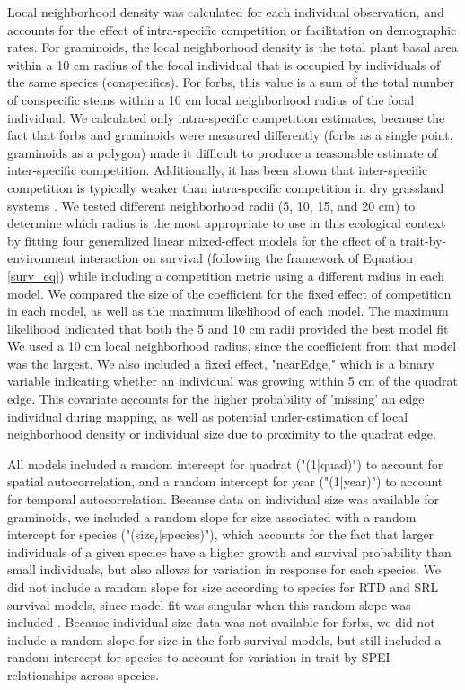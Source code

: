 \documentclass[12pt, letterpaper]{article}
\begin{document}
Local neighborhood density was calculated for each individual observation, and accounts for the effect of intra-specific competition or facilitation on demographic rates. For graminoids, the local neighborhood density is the total plant basal area within a 10 cm radius of the focal individual that is occupied by individuals of the same species (conspecifics). For forbs, this value is a sum of the total number of conspecific stems within a 10 cm local neighborhood radius of the focal individual. We calculated only intra-specific competition estimates, because the fact that forbs and graminoids were measured differently (forbs as a single point, graminoids as a polygon) made it difficult to produce a reasonable estimate of inter-specific competition. Additionally, it has been shown that inter-specific competition is typically weaker than intra-specific competition in dry grassland systems \citep{Adler2018,Laughlin2018}.  We tested different neighborhood radii (5, 10, 15, and 20 cm) to determine which radius is the most appropriate to use in this ecological context by fitting four generalized linear mixed-effect models for the effect of a trait-by-environment interaction on survival (following the framework of Equation \ref{surv_eq}) while including a competition metric using a different radius in each model. We compared the size of the coefficient for the fixed effect of competition in each model, as well as the maximum likelihood of each model. The maximum likelihood indicated that both the 5 and 10 cm radii provided the best model fit We used a 10 cm local neighborhood radius, since the coefficient from that model was the largest. We also included a fixed effect, "nearEdge," which is a binary variable indicating whether an individual was growing within 5 cm of the quadrat edge. This covariate accounts for the higher probability of 'missing' an edge individual during mapping, as well as potential under-estimation of local neighborhood density or individual size due to proximity to the quadrat edge. 

All models included a random intercept for quadrat ("(1|quad)") to account for spatial autocorrelation, and a random intercept for year ("(1|year)") to account for temporal autocorrelation. Because data on individual size was available for graminoids, we included a random slope for size associated with a random intercept for species ("(size$_\textit{t}$|species)"), which accounts for the fact that larger individuals of a given species have a higher growth and survival probability than small individuals, but also allows for variation in response for each species. We did not include a random slope for size according to species for RTD and SRL survival models, since model fit was singular when this random slope was included \citep{Bates2015}. Because individual size data was not available for forbs, we did not include a random slope for size in the forb survival models, but still included a random intercept for species to account for variation in trait-by-SPEI relationships across species. 
\end{document}
